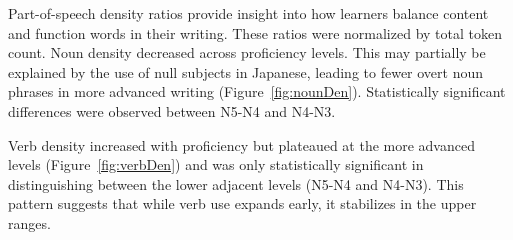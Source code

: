 Part-of-speech density ratios provide insight into how learners balance content and function words in their writing.
These ratios were normalized by total token count.
Noun density decreased across proficiency levels. This may partially be explained by the use of null subjects in
Japanese, leading to fewer overt noun phrases in more advanced writing (Figure~\ref{fig:nounDen}). Statistically significant
differences were
observed between N5-N4 and N4-N3.

Verb density increased with proficiency but plateaued at the more advanced levels (Figure~\ref{fig:verbDen}) and was only
statistically
significant in distinguishing between the lower adjacent levels (N5-N4 and N4-N3). This pattern suggests that while
verb use expands early, it stabilizes in the upper ranges.

